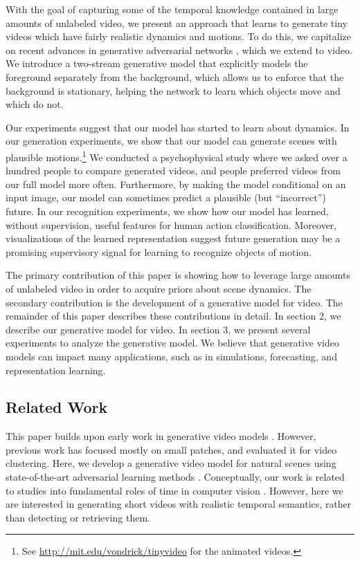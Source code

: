 \documentclass{article}
\begin{document}
With the goal of capturing some of the temporal knowledge contained in large amounts of unlabeled video, we present an approach that learns to generate tiny videos which have fairly realistic dynamics and motions. To do this, we capitalize  on recent advances in generative adversarial networks \cite{goodfellow2014generative,radford2015unsupervised,denton2015deep}, which we extend to video. We introduce a two-stream generative model that explicitly models the foreground separately from the background, which allows us to enforce that the background is stationary, helping the network to learn which objects move and which do not. 

Our experiments suggest that our model has started to learn about dynamics. In our generation experiments, we show that our model can generate scenes with plausible motions.\footnote{See \url{http://mit.edu/vondrick/tinyvideo} for the animated videos.} We conducted a psychophysical study where we asked over a hundred people to compare generated videos, and people preferred videos from our full model more often. Furthermore, by making the model conditional on an input image, our model can sometimes predict a plausible (but ``incorrect'') future. In our recognition experiments, we show how our model has learned, without supervision, useful features for human action classification. Moreover,  visualizations of the learned representation suggest future generation may be a promising supervisory signal for learning to recognize objects of motion.

The primary contribution of this paper is showing how to leverage large amounts of unlabeled video in order to acquire priors about scene dynamics. The secondary contribution is the development of a generative model for video. The remainder of this paper describes these contributions in detail. In section 2, we describe our generative model for video. In section 3, we present several experiments to analyze the generative model. We believe that generative video models can impact many applications, such as in simulations, forecasting, and representation learning.

\subsection{Related Work}

This paper builds upon early work in generative video models \cite{petrovic2006recursive}. However, previous work has focused mostly on small patches, and evaluated it for video clustering. Here, we develop a generative video model for natural scenes using state-of-the-art adversarial learning methods \cite{goodfellow2014generative,radford2015unsupervised}. Conceptually, our work is related to studies into fundamental roles of time in computer vision \cite{pickup2014seeing,isola2015discovering,basha2012photo,fiser2002statistical,misra2016unsupervised}. However, here we are interested in generating short videos with realistic temporal semantics, rather than detecting or retrieving them.
\end{document}
